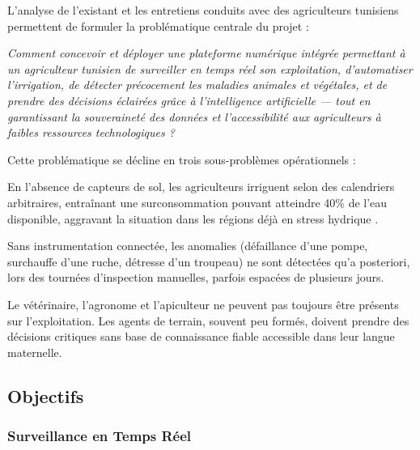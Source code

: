 \documentclass[12pt, a4paper]{report}
\begin{document}
L'analyse de l'existant et les entretiens conduits avec des agriculteurs tunisiens permettent de formuler la problématique centrale du projet :

\begin{tcolorbox}[colback=primary!8, colframe=primary, title={\textbf{Problématique}}, fonttitle=\bfseries]
\textit{Comment concevoir et déployer une plateforme numérique intégrée permettant à un agriculteur tunisien de surveiller en temps réel son exploitation, d'automatiser l'irrigation, de détecter précocement les maladies animales et végétales, et de prendre des décisions éclairées grâce à l'intelligence artificielle — tout en garantissant la souveraineté des données et l'accessibilité aux agriculteurs à faibles ressources technologiques ?}
\end{tcolorbox}

\medskip

Cette problématique se décline en trois sous-problèmes opérationnels :

\begin{description}[leftmargin=2cm, font=\textcolor{primary}\bfseries]
    \item[Gaspillage hydrique :] En l'absence de capteurs de sol, les agriculteurs irriguent selon des calendriers arbitraires, entraînant une surconsommation pouvant atteindre 40\% de l'eau disponible, aggravant la situation dans les régions déjà en stress hydrique \cite{worldbank2019}.

    \item[Absence de surveillance en temps réel :] Sans instrumentation connectée, les anomalies (défaillance d'une pompe, surchauffe d'une ruche, détresse d'un troupeau) ne sont détectées qu'a posteriori, lors des tournées d'inspection manuelles, parfois espacées de plusieurs jours.

    \item[Prise de décision manuelle et non assistée :] Le vétérinaire, l'agronome et l'apiculteur ne peuvent pas toujours être présents sur l'exploitation. Les agents de terrain, souvent peu formés, doivent prendre des décisions critiques sans base de connaissance fiable accessible dans leur langue maternelle.
\end{description}

\subsection{Objectifs}

\subsubsection{Surveillance en Temps Réel}
\end{document}
